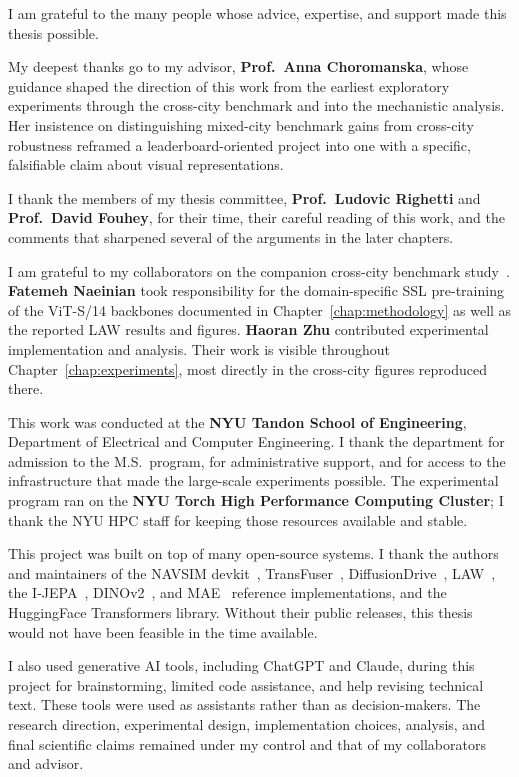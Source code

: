 
I am grateful to the many people whose advice, expertise, and support made this thesis possible.

My deepest thanks go to my advisor, \textbf{Prof.\ Anna Choromanska}, whose guidance shaped the direction of this work from the earliest exploratory experiments through the cross-city benchmark and into the mechanistic analysis. Her insistence on distinguishing mixed-city benchmark gains from cross-city robustness reframed a leaderboard-oriented project into one with a specific, falsifiable claim about visual representations.

I thank the members of my thesis committee, \textbf{Prof.\ Ludovic Righetti} and \textbf{Prof.\ David Fouhey}, for their time, their careful reading of this work, and the comments that sharpened several of the arguments in the later chapters.

I am grateful to my collaborators on the companion cross-city benchmark study~\cite{naeinian-cross-city-2026}. \textbf{Fatemeh Naeinian} took responsibility for the domain-specific SSL pre-training of the ViT-S/14 backbones documented in Chapter~\ref{chap:methodology} as well as the reported LAW results and figures. \textbf{Haoran Zhu} contributed experimental implementation and analysis. Their work is visible throughout Chapter~\ref{chap:experiments}, most directly in the cross-city figures reproduced there.

This work was conducted at the \textbf{NYU Tandon School of Engineering}, Department of Electrical and Computer Engineering. I thank the department for admission to the M.S.\ program, for administrative support, and for access to the infrastructure that made the large-scale experiments possible. The experimental program ran on the \textbf{NYU Torch High Performance Computing Cluster}; I thank the NYU HPC staff for keeping those resources available and stable.

This project was built on top of many open-source systems. I thank the authors and maintainers of the NAVSIM devkit~\cite{dauner-navsim-2024}, TransFuser~\cite{chitta-transfuser-2023}, DiffusionDrive~\cite{jia-diffusiondrive-2025}, LAW~\cite{li-law-2024}, the I-JEPA~\cite{assran-ijepa-2023}, DINOv2~\cite{oquab-dinov2-2024}, and MAE~\cite{he-mae-2022} reference implementations, and the HuggingFace Transformers library. Without their public releases, this thesis would not have been feasible in the time available.

I also used generative AI tools, including ChatGPT and Claude, during this project for brainstorming, limited code assistance, and help revising technical text. These tools were used as assistants rather than as decision-makers. The research direction, experimental design, implementation choices, analysis, and final scientific claims remained under my control and that of my collaborators and advisor.

